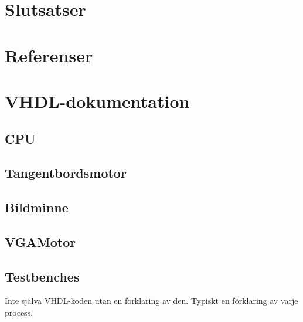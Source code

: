 \documentclass[]{article}
\begin{document}
\section{Slutsatser}
\section{Referenser}
\section{VHDL-dokumentation}
\subsection{CPU}

\subsection{Tangentbordsmotor}

\subsection{Bildminne}

\subsection{VGAMotor}

\subsection{Testbenches}
Inte själva VHDL-koden utan en förklaring av den. Typiskt en förklaring av varje process.
\end{document}
